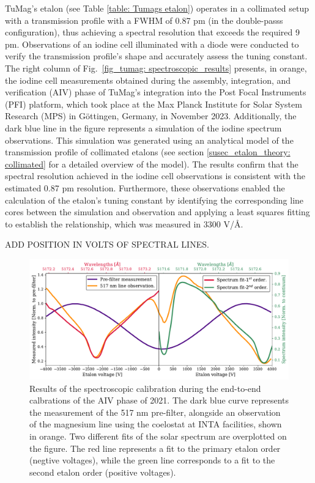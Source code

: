 TuMag's etalon (see Table \ref{table: Tumags etalon}) operates in a collimated setup with a transmission profile with a FWHM of 0.87 pm (in the double-passs configuration), thus achieving a spectral resolution that exceeds the required 9 pm. Observations of an iodine cell illuminated with a diode were conducted to verify the transmission profile's shape and accurately assess the tuning constant. The right column of Fig.~\ref{fig_tumag: spectroscopic_results} presents, in orange, the iodine cell measurements obtained during the assembly, integration, and verification (AIV) phase of TuMag's integration into the Post Focal Instruments (PFI) platform, which took place at the Max Planck Institute for Solar System Research (MPS) in Göttingen, Germany, in November 2023. Additionally, the dark blue line in the figure represents a simulation of the iodine spectrum observations. This simulation was generated using an analytical model of the transmission profile of collimated etalons (see section \ref{susec_etalon_theory: collimated} for a detailed overview of the model). The results confirm that the spectral resolution achieved in the iodine cell observations is consistent with the estimated 0.87 pm resolution. Furthermore, these observations enabled the calculation of the etalon's tuning constant by identifying the corresponding line cores between the simulation and observation and applying a least squares fitting to establish the relationship, which was measured in 3300 V/\r{A}.

ADD POSITION IN VOLTS OF SPECTRAL LINES.


\begin{figure}
    \includegraphics[width=\textwidth]{figures/TuMag/secondorder.pdf}
    \caption{
      Results of the spectroscopic calibration during the end-to-end calbrations of the AIV phase of 2021. The dark blue curve represents the measurement of the 517 nm pre-filter, alongside an observation of the magnesium line using the coelostat at INTA facilities, shown in orange. Two different fits of the solar spectrum are overplotted on the figure. The red line represents a fit to the primary etalon order (negtive voltages), while the green line corresponds to a fit to the second etalon order (positive voltages).      
      \label{fig_tumag:second-order_cont}}
\end{figure}

